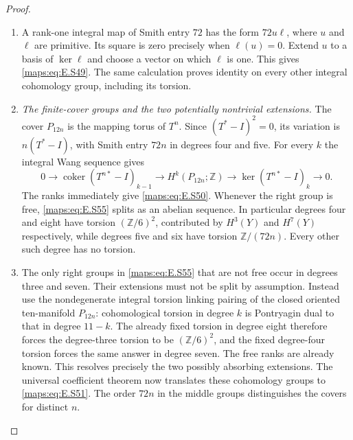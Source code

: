 \begin{proof}
\begin{enumerate}[label=\arabic*.,leftmargin=*]
\item A rank-one integral map of Smith entry $72$ has the
form $72u\ell$, where $u$ and $\ell$ are primitive.
Its square is zero precisely when $\ell(u)=0$.
Extend $u$ to a basis of $\ker\ell$ and choose a vector
on which $\ell$ is one. This gives \eqref{maps:eq:E.S49}. The same
calculation proves identity on every other integral
cohomology group, including its torsion.

\item \emph{The finite-cover groups and the two potentially nontrivial extensions.}
The cover $P_{12n}$ is the mapping torus of $T^n$.
Since $(T^*-I)^2=0$, its variation is $n(T^*-I)$,
with Smith entry $72n$ in degrees four and five.
For every $k$ the integral Wang sequence gives
\[
 0\longrightarrow\operatorname{coker}(T^{n*}-I)_{k-1}
 \longrightarrow H^k(P_{12n};\mathbb Z)
 \longrightarrow\ker(T^{n*}-I)_k\longrightarrow0.
 \tag{E.S55}\label{maps:eq:E.S55}
\]
The ranks immediately give \eqref{maps:eq:E.S50}. Whenever the right
group is free, \eqref{maps:eq:E.S55} splits as an abelian sequence.
In particular degrees four and eight have torsion
$(\mathbb Z/6)^2$, contributed by $H^3(Y)$ and $H^7(Y)$
respectively, while degrees five and six have torsion
$\mathbb Z/(72n)$. Every other such degree has no torsion.

\item The only right groups in \eqref{maps:eq:E.S55} that are not free
occur in degrees three and seven. Their extensions
must not be split by assumption. Instead use the
nondegenerate integral torsion linking pairing of the
closed oriented ten-manifold $P_{12n}$: cohomological
torsion in degree $k$ is Pontryagin dual to that in
degree $11-k$. The already fixed torsion in degree
eight therefore forces the degree-three torsion to
be $(\mathbb Z/6)^2$, and the fixed degree-four torsion
forces the same answer in degree seven. The free
ranks are already known. This resolves precisely
the two possibly absorbing extensions. The universal
coefficient theorem now translates these cohomology
groups to \eqref{maps:eq:E.S51}. The order $72n$ in the middle
groups distinguishes the covers for distinct $n$.
\end{enumerate}
\end{proof}


